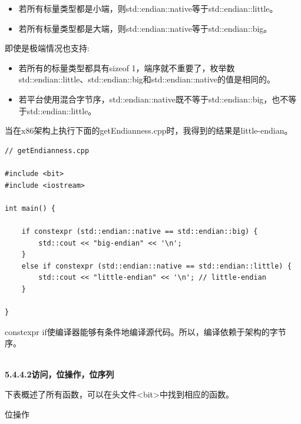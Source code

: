 \begin{itemize}
\item 
若所有标量类型都是小端，则std::endian::native等于std::endian::little。

\item 
若所有标量类型都是大端，则std::endian::native等于std::endian::big。
\end{itemize}

即使是极端情况也支持:

\begin{itemize}
\item 
若所有的标量类型都具有sizeof 1，端序就不重要了，枚举数std::endian::little、std::endian::big和std::endian::native的值是相同的。

\item 
若平台使用混合字节序，std::endian::native既不等于std::endian::big，也不等于std::endian::little。
\end{itemize}

当在x86架构上执行下面的getEndianness.cpp时，我得到的结果是little-endian。

\begin{lstlisting}[style=styleCXX]
// getEndianness.cpp

#include <bit>
#include <iostream>

int main() {
	
	if constexpr (std::endian::native == std::endian::big) {
		std::cout << "big-endian" << '\n';
	}
	else if constexpr (std::endian::native == std::endian::little) {
		std::cout << "little-endian" << '\n'; // little-endian
	}

}
\end{lstlisting}

constexpr if使编译器能够有条件地编译源代码。所以，编译依赖于架构的字节序。

\hspace*{\fill} \\ %
\noindent
\textbf{5.4.4.2\hspace{0.2cm}访问，位操作，位序列}

下表概述了所有函数，可以在头文件<bit>中找到相应的函数。

\begin{center}
位操作
\end{center}

